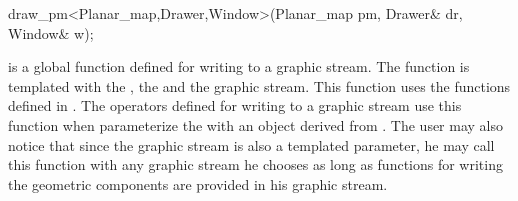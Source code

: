 
\ccRefPageBegin


\begin{ccRefFunction}{draw_pm<Planar_map,Drawer,Window>(Planar_map pm, Drawer& dr, Window& w);}
    

\ccDefinition
{} is a global function defined for writing  to a graphic stream. 
The function is templated with the , the  and the graphic stream.  
This function uses the functions defined in .
The operators defined for writing  to a graphic stream use this function when parameterize the 
 with an object derived from . The user may also notice that since the graphic stream is also 
a templated parameter, he may call this function with any graphic stream he chooses as long as functions for writing the geometric 
components are provided in his graphic stream.

\end{ccRefFunction} %

\ccRefPageEnd











